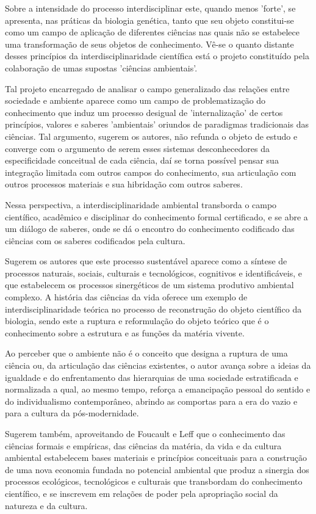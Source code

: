 \documentclass[
   article,       %
   12pt,          %
   oneside,       %
   a4paper,       %
   english,       %
   brazil,           %
   sumario=tradicional
   ]{abntex2}
\begin{document}
Sobre a intensidade do processo interdisciplinar este, quando menos 'forte', se apresenta, nas práticas da biologia genética, tanto que seu objeto constitui-se como um campo de aplicação de diferentes ciências nas quais não se estabelece uma transformação de seus objetos de conhecimento.
Vê-se o quanto distante desses princípios da interdisciplinaridade científica está o projeto constituído pela colaboração de umas supostas 'ciências ambientais'.

Tal projeto encarregado de analisar o campo generalizado das relações entre sociedade e ambiente aparece como um campo de problematização do conhecimento que induz um processo desigual de 'internalização' de certos princípios, valores e saberes 'ambientais' oriundos de paradigmas tradicionais das ciências. Tal argumento, sugerem os autores, não refunda o objeto de estudo e converge com o argumento de serem esses sistemas desconhecedores da especificidade conceitual de cada ciência, daí se torna possível pensar sua integração limitada com outros campos do conhecimento, sua articulação com outros processos materiais e sua hibridação com outros saberes.

Nessa perspectiva, a interdisciplinaridade ambiental transborda o campo científico, acadêmico e disciplinar do conhecimento formal certificado, e se abre a um diálogo de saberes, onde se dá o encontro do conhecimento codificado das ciências com os saberes codificados pela cultura.

Sugerem os autores que este processo sustentável aparece como a síntese de processos naturais, sociais, culturais e tecnológicos, cognitivos e identificáveis, e que estabelecem os processos sinergéticos de um sistema produtivo ambiental complexo. A história das ciências da vida oferece um exemplo de interdisciplinaridade teórica no processo de reconstrução do objeto científico da biologia, sendo este a ruptura e reformulação do objeto teórico que é o conhecimento sobre a estrutura e as funções da matéria vivente.

Ao perceber que o ambiente não é o conceito que designa a ruptura de uma ciência ou, da articulação das ciências existentes, o autor avança sobre a ideias da igualdade e do enfrentamento das hierarquias de uma sociedade estratificada e normalizada a qual, ao mesmo tempo, reforça a emancipação pessoal do sentido e do individualismo contemporâneo, abrindo as comportas para a era do vazio e para a cultura da pós-modernidade. 

Sugerem também, aproveitando de Foucault e Leff que o conhecimento das ciências formais e empíricas, das ciências da matéria, da vida e da cultura ambiental estabelecem bases materiais e princípios conceituais para a construção de uma nova economia fundada no potencial ambiental que produz a sinergia dos processos ecológicos, tecnológicos e culturais que transbordam do conhecimento científico, e se inscrevem em relações de poder pela apropriação social da natureza e da cultura.
\end{document}
